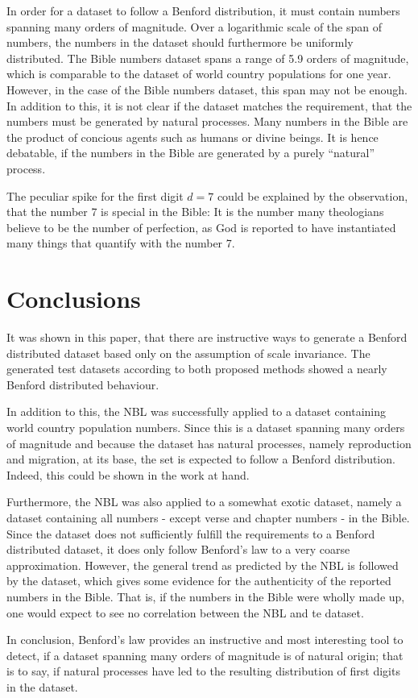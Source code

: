 \documentclass[a4paper,10pt, twocolumn]{article}
\begin{document}
In order for a dataset to follow a Benford distribution, it must contain numbers spanning many orders of magnitude. Over a logarithmic scale of the span of numbers, the numbers in the dataset should furthermore be uniformly distributed. The Bible numbers dataset spans a range of 5.9 orders of magnitude, which is comparable to the dataset of world country populations for one year. However, in the case of the Bible numbers dataset, this span may not be enough. In addition to this, it is not clear if the dataset matches the requirement, that the numbers must be generated by natural processes. Many numbers in the Bible are the product of concious agents such as humans or divine beings. It is hence debatable, if the numbers in the Bible are generated by a purely ``natural'' process.

The peculiar spike for the first digit $d=7$ could be explained by the observation, that the number 7 is special in the Bible: It is the number many theologians believe to be the number of perfection, as God is reported to have instantiated many things that quantify with the number 7.


\section{Conclusions}
It was shown in this paper, that there are instructive ways to generate a Benford distributed dataset based only on the assumption of scale invariance. The generated test datasets according to both proposed methods showed a nearly Benford distributed behaviour.

In addition to this, the NBL was successfully applied to a dataset containing world country population numbers. Since this is a dataset spanning many orders of magnitude and because the dataset has natural processes, namely reproduction and migration, at its base, the set is expected to follow a Benford distribution. Indeed, this could be shown in the work at hand.

Furthermore, the NBL was also applied to a somewhat exotic dataset, namely a dataset containing all numbers - except verse and chapter numbers - in the Bible. Since the dataset does not sufficiently fulfill the requirements to a Benford distributed dataset, it does only follow Benford's law to a very coarse approximation. However, the general trend as predicted by the NBL is followed by the dataset, which gives some evidence for the authenticity of the reported numbers in the Bible. That is, if the numbers in the Bible were wholly made up, one would expect to see no correlation between the NBL and te dataset.

In conclusion, Benford's law provides an instructive and most interesting tool to detect, if a dataset spanning many orders of magnitude is of natural origin; that is to say, if natural processes have led to the resulting distribution of first digits in the dataset.

\appendix





\end{document}
